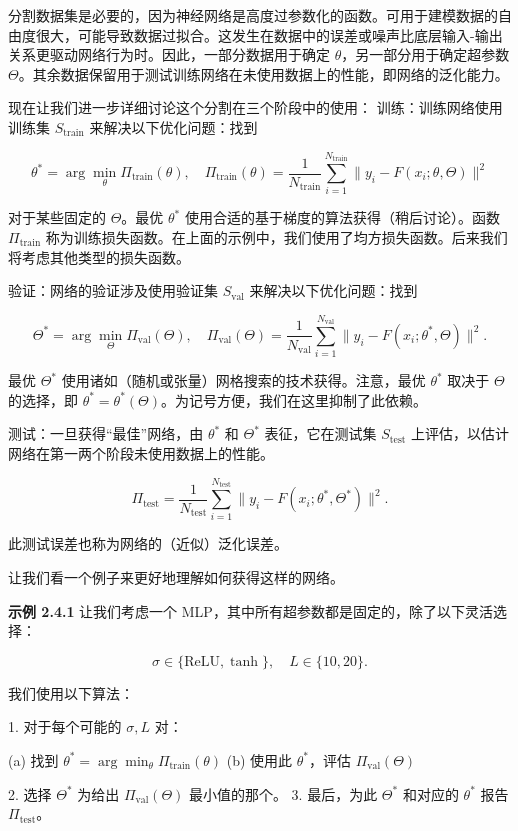 分割数据集是必要的，因为神经网络是高度过参数化的函数。可用于建模数据的自由度很大，可能导致数据过拟合。这发生在数据中的误差或噪声比底层输入-输出关系更驱动网络行为时。因此，一部分数据用于确定 $\theta$，另一部分用于确定超参数 $\Theta$。其余数据保留用于测试训练网络在未使用数据上的性能，即网络的泛化能力。

现在让我们进一步详细讨论这个分割在三个阶段中的使用：
训练：训练网络使用训练集 $S_{\text{train}}$ 来解决以下优化问题：找到

\[
\theta^* = \arg\min_\theta \Pi_{\text{train}}(\theta), \quad \Pi_{\text{train}}(\theta) = \frac{1}{N_{\text{train}}} \sum_{i=1}^{N_{\text{train}}} \| y_i - F(x_i; \theta, \Theta) \|^2
\]

对于某些固定的 $\Theta$。最优 $\theta^*$ 使用合适的基于梯度的算法获得（稍后讨论）。函数 $\Pi_{\text{train}}$ 称为训练损失函数。在上面的示例中，我们使用了均方损失函数。后来我们将考虑其他类型的损失函数。

验证：网络的验证涉及使用验证集 $S_{\text{val}}$ 来解决以下优化问题：找到

\[
\Theta^* = \arg\min_\Theta \Pi_{\text{val}}(\Theta), \quad \Pi_{\text{val}}(\Theta) = \frac{1}{N_{\text{val}}} \sum_{i=1}^{N_{\text{val}}} \| y_i - F(x_i; \theta^*, \Theta) \|^2.
\]

最优 $\Theta^*$ 使用诸如（随机或张量）网格搜索的技术获得。注意，最优 $\theta^*$ 取决于 $\Theta$ 的选择，即 $\theta^* = \theta^*(\Theta)$。为记号方便，我们在这里抑制了此依赖。

测试：一旦获得“最佳”网络，由 $\theta^*$ 和 $\Theta^*$ 表征，它在测试集 $S_{\text{test}}$ 上评估，以估计网络在第一两个阶段未使用数据上的性能。

\[
\Pi_{\text{test}} = \frac{1}{N_{\text{test}}} \sum_{i=1}^{N_{\text{test}}} \| y_i - F(x_i; \theta^*, \Theta^*) \|^2.
\]

此测试误差也称为网络的（近似）泛化误差。

让我们看一个例子来更好地理解如何获得这样的网络。

\textbf{示例 2.4.1} 让我们考虑一个 MLP，其中所有超参数都是固定的，除了以下灵活选择：

\[
\sigma \in \{\text{ReLU}, \tanh\}, \quad L \in \{10, 20\}.
\]

我们使用以下算法：

1. 对于每个可能的 $\sigma, L$ 对：

(a) 找到 $\theta^* = \arg\min_\theta \Pi_{\text{train}}(\theta)$
(b) 使用此 $\theta^*$，评估 $\Pi_{\text{val}}(\Theta)$

2. 选择 $\Theta^*$ 为给出 $\Pi_{\text{val}}(\Theta)$ 最小值的那个。
3. 最后，为此 $\Theta^*$ 和对应的 $\theta^*$ 报告 $\Pi_{\text{test}}$。

